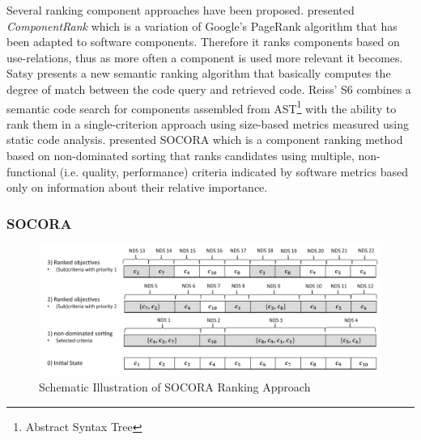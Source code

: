 Several ranking component approaches have been proposed. \citet{Inoue2005} presented \emph{ComponentRank} which is a variation of Google's PageRank algorithm that has been adapted to software components. Therefore it ranks components based on use-relations, thus as more often a component is used more relevant it becomes. Satsy\cite{Stolee2016} presents a new semantic ranking algorithm that basically computes the degree of match between the code query and retrieved code. Reiss' S6\cite{Reiss2009} combines a semantic code search for components assembled from AST\footnote{Abstract Syntax Tree} with the ability to rank them in a single-criterion approach using size-based metrics measured using static code analysis. \citet{Kessel2016} presented SOCORA which is a component ranking method based on non-dominated sorting that ranks candidates using multiple, non-functional (i.e. quality, performance) criteria indicated by software metrics based only on information about their relative importance\cite{Kessel2016}.

\subsubsection{SOCORA}

\begin{figure}[ht]
	\centering
    \includegraphics[width=\textwidth]{grafiken/socoraExample}
    \caption{Schematic Illustration of SOCORA Ranking Approach \cite{Kessel2016}}
    \label{fig:socora-ex}
\end{figure}

